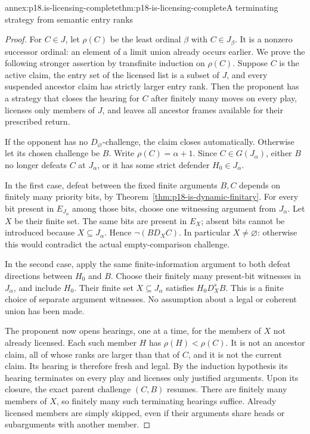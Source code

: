 \begin{annexitem}{annex:p18.is-licensing-complete}{thm:p18-is-licensing-complete}{A terminating strategy from semantic entry ranks}
\begin{proof}
For \(C\in J\), let \(\rho(C)\) be the least ordinal \(\beta\)
with \(C\in J_\beta\). It is a nonzero successor ordinal:
an element of a limit union already occurs earlier.
We prove the following stronger assertion by transfinite induction
on \(\rho(C)\). Suppose \(C\) is the active claim, the entry set
of the licensed list is a subset of \(J\), and every suspended ancestor claim
has strictly larger entry rank. Then the proponent has a strategy
that closes the hearing for \(C\) after finitely many moves
on every play, licenses only members of \(J\), and leaves all
ancestor frames available for their prescribed return.

If the opponent has no \(D_\varnothing\)-challenge, the claim
closes automatically. Otherwise let its chosen challenge be \(B\).
Write \(\rho(C)=\alpha+1\). Since \(C\in G(J_\alpha)\), either
\(B\) no longer defeats \(C\) at \(J_\alpha\), or it has some
strict defender \(H_0\in J_\alpha\).

In the first case, defeat between the fixed finite arguments
\(B,C\) depends on finitely many priority bits, by
Theorem~\ref{thm:p18-is-dynamic-finitary}.
For every bit present in \(E_{J_\alpha}\) among those bits,
choose one witnessing argument from \(J_\alpha\).
Let \(X\) be their finite set. The same bits are present in
\(E_X\); absent bits cannot be introduced because
\(X\subseteq J_\alpha\). Hence \(\neg(B D_X C)\).
In particular \(X\ne\varnothing\): otherwise this would
contradict the actual empty-comparison challenge.

In the second case, apply the same finite-information argument
to both defeat directions between \(H_0\) and \(B\).
Choose their finitely many present-bit witnesses in \(J_\alpha\),
and include \(H_0\). Their finite set \(X\subseteq J_\alpha\)
satisfies \(H_0 D_X^s B\).
This is a finite choice of separate argument witnesses. No
assumption about a legal or coherent union has been made.

The proponent now opens hearings, one at a time, for the members
of \(X\) not already licensed. Each such member \(H\) has
\(\rho(H)<\rho(C)\). It is not an ancestor claim, all of whose
ranks are larger than that of \(C\), and it is not the current
claim. Its hearing is therefore fresh and legal.
By the induction hypothesis its hearing terminates on every
play and licenses only justified arguments. Upon its closure,
the exact parent challenge \((C,B)\) resumes.
There are finitely many members of \(X\), so finitely many such
terminating hearings suffice. Already licensed members are
simply skipped, even if their arguments share heads or
subarguments with another member.


\end{proof}
\end{annexitem}

